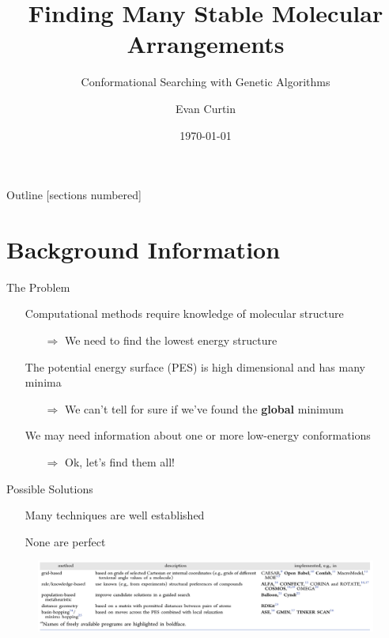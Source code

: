 \documentclass[10pt]{beamer}
\title{Finding Many Stable Molecular Arrangements}
\subtitle{Conformational Searching with Genetic Algorithms}
\date{\today}
\author{Evan Curtin}
\institute{University of Illinois at Urbana-Champaign}
\begin{document}
\maketitle

\begin{frame}{Outline}
  [sections numbered]
  \tableofcontents[hideallsubsections]
\end{frame}

\section{Background Information}

\begin{frame}[fragile]{The Problem}
	\begin{itemize}[<+->]
		\item[] {Computational methods require knowledge of molecular structure}
		\begin{itemize}
			\item[$\Rightarrow$] {We need to find the lowest energy structure}
		\end{itemize}
		\item[] {The potential energy surface (PES) is high dimensional and has many minima}
		\begin{itemize}
			\item[$\Rightarrow$] {We can't tell for sure if we've found the \alert{\textbf{global}} minimum}
		\end{itemize}
		\item[] {We may need information about one or more low-energy conformations}
		\begin{itemize}
			\item[$\Rightarrow$] {Ok, let's find them all!}
		\end{itemize}	
	\end{itemize}
\end{frame}

{%
\begin{frame}[fragile]{Possible Solutions}
	\begin{itemize}[<+->]
		\item[] {Many techniques are well established}
		\item[] {None are perfect}
	\end{itemize}
	\begin{figure}
		\includegraphics[width=\linewidth]{images/ImplementationTables.PNG}
	\end{figure}
\end{frame}
}
\end{document}
